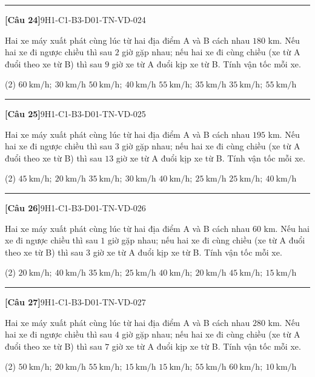 \documentclass[12pt,a4paper]{article}
\newif\ifloigiai
\newenvironment{cauhoi}[2]{%
  \par\medskip\noindent\rule{\textwidth}{0.4pt}\par\nopagebreak
  \noindent\textbf{[#1]}\hfill{\scriptsize\ttfamily #2}\par\nopagebreak\smallskip}{\par}
\newcommand{\dapan}[1]{\ifloigiai\par\smallskip\noindent\textit{Đáp án:} \textbf{#1}\par\fi}
\begin{document}
\begin{cauhoi}{Câu 24}{9H1-C1-B3-D01-TN-VD-024}
Hai xe máy xuất phát cùng lúc từ hai địa điểm A và B cách nhau $180$ km. Nếu hai xe đi ngược chiều thì sau $2$ giờ gặp nhau; nếu hai xe đi cùng chiều (xe từ A đuổi theo xe từ B) thì sau $9$ giờ xe từ A đuổi kịp xe từ B. Tính vận tốc mỗi xe.
\begin{tasks}(2)
\task $60\ \text{km/h};\ 30\ \text{km/h}$
\task $50\ \text{km/h};\ 40\ \text{km/h}$
\task $55\ \text{km/h};\ 35\ \text{km/h}$
\task $35\ \text{km/h};\ 55\ \text{km/h}$
\end{tasks}
\dapan{C}
\end{cauhoi}
\begin{cauhoi}{Câu 25}{9H1-C1-B3-D01-TN-VD-025}
Hai xe máy xuất phát cùng lúc từ hai địa điểm A và B cách nhau $195$ km. Nếu hai xe đi ngược chiều thì sau $3$ giờ gặp nhau; nếu hai xe đi cùng chiều (xe từ A đuổi theo xe từ B) thì sau $13$ giờ xe từ A đuổi kịp xe từ B. Tính vận tốc mỗi xe.
\begin{tasks}(2)
\task $45\ \text{km/h};\ 20\ \text{km/h}$
\task $35\ \text{km/h};\ 30\ \text{km/h}$
\task $40\ \text{km/h};\ 25\ \text{km/h}$
\task $25\ \text{km/h};\ 40\ \text{km/h}$
\end{tasks}
\dapan{C}
\end{cauhoi}
\begin{cauhoi}{Câu 26}{9H1-C1-B3-D01-TN-VD-026}
Hai xe máy xuất phát cùng lúc từ hai địa điểm A và B cách nhau $60$ km. Nếu hai xe đi ngược chiều thì sau $1$ giờ gặp nhau; nếu hai xe đi cùng chiều (xe từ A đuổi theo xe từ B) thì sau $3$ giờ xe từ A đuổi kịp xe từ B. Tính vận tốc mỗi xe.
\begin{tasks}(2)
\task $20\ \text{km/h};\ 40\ \text{km/h}$
\task $35\ \text{km/h};\ 25\ \text{km/h}$
\task $40\ \text{km/h};\ 20\ \text{km/h}$
\task $45\ \text{km/h};\ 15\ \text{km/h}$
\end{tasks}
\dapan{C}
\end{cauhoi}
\begin{cauhoi}{Câu 27}{9H1-C1-B3-D01-TN-VD-027}
Hai xe máy xuất phát cùng lúc từ hai địa điểm A và B cách nhau $280$ km. Nếu hai xe đi ngược chiều thì sau $4$ giờ gặp nhau; nếu hai xe đi cùng chiều (xe từ A đuổi theo xe từ B) thì sau $7$ giờ xe từ A đuổi kịp xe từ B. Tính vận tốc mỗi xe.
\begin{tasks}(2)
\task $50\ \text{km/h};\ 20\ \text{km/h}$
\task $55\ \text{km/h};\ 15\ \text{km/h}$
\task $15\ \text{km/h};\ 55\ \text{km/h}$
\task $60\ \text{km/h};\ 10\ \text{km/h}$
\end{tasks}
\dapan{B}
\end{cauhoi}
\end{document}

